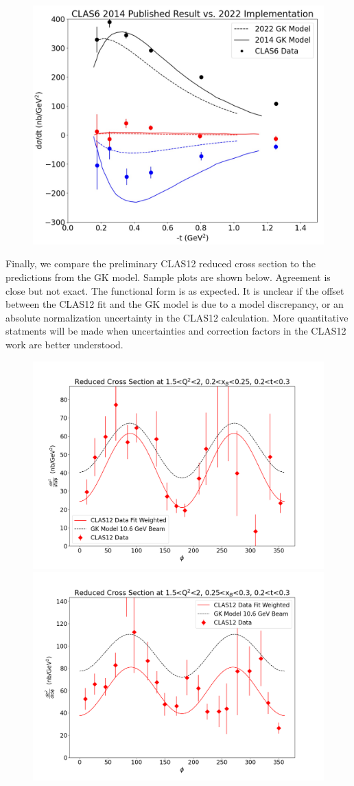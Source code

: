 \begin{figure}[hbt]
	\centering
	\includegraphics[page=6,width=0.6\linewidth]{Chapters/Ch5-FurtherAnalysis/pics/2022_vs_2014_GK_model.jpg}
\end{figure}\label{fig:oldres2}

Finally, we compare the preliminary CLAS12 reduced cross section to the predictions from the GK model. Sample plots are shown below. Agreement is close but not exact. The functional form is as expected. It is unclear if the offset between the CLAS12 fit and the GK model is due to a model discrepancy, or an absolute normalization uncertainty in the CLAS12 calculation. More quantitative statments will be made when uncertainties and correction factors in the CLAS12 work are better understood.
\begin{figure}[hbt]
	\centering
	\includegraphics[page=6,width=0.45\linewidth]{Chapters/Ch5-FurtherAnalysis/pics/reduced_xsec_1.5_2_0.2_0.25_0.2_0.3.png}
	\includegraphics[page=6,width=0.45\linewidth]{Chapters/Ch5-FurtherAnalysis/pics/reduced_xsec_1.5_2_0.25_0.3_0.2_0.3.png}
\end{figure}\label{fig:oldres4}



